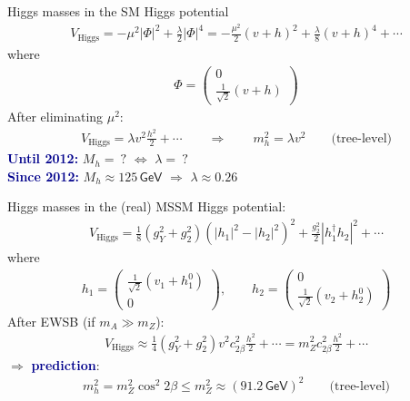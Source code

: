 \documentclass[hyperref={pdfpagelabels=false},ngerman]{beamer}
\newcommand{\eh}[1]{\,\mathsf{#1}}
\renewcommand{\emph}[1]{\textbf{\textcolor{darkblue}{#1}}}
\begin{document}

\begin{frame}[noframenumbering]{Higgs masses in the SM}
  Higgs potential
  \begin{align*}
    V_{\text{Higgs}} = -\mu^2 |\Phi|^2 + \frac{\lambda}{2}|\Phi|^4
    = -\frac{\mu^2}{2} (v+h)^2 + \frac{\lambda}{8} (v+h)^4 + \cdots
  \end{align*}
  where
  \begin{align*}
    \Phi =
    \begin{pmatrix}
      0 \\ \frac{1}{\sqrt{2}} (v + h)
    \end{pmatrix}
  \end{align*}
  After eliminating $\mu^2$:
  \begin{align*}
    V_{\text{Higgs}} = \lambda v^2 \frac{h^2}{2} + \cdots
    \qquad\Rightarrow\qquad
    m_h^2 = \lambda v^2  \qquad \text{(tree-level)}
  \end{align*}
  \emph{Until 2012:} $M_h =\ ?$ $\Leftrightarrow$ $\lambda =\ ?$\\
  \emph{Since 2012:} $M_h \approx 125\eh{GeV}$ $\Rightarrow$ $\lambda \approx 0.26$
\end{frame}


\begin{frame}[noframenumbering]{Higgs masses in the (real) MSSM}
  Higgs potential:
  \begin{align*}
    V_{\text{Higgs}} = \frac{1}{8}(g_Y^2 + g_2^2)(|h_1|^2 - |h_2|^2)^2 + \frac{g_2^2}{2}|h_1^\dagger h_2|^2 + \cdots
  \end{align*}
  where
  \begin{align*}
    h_1 =
    \begin{pmatrix}
      \frac{1}{\sqrt{2}} (v_1 + h_1^0) \\ 0
    \end{pmatrix}, \qquad
    h_2 =
    \begin{pmatrix}
      0 \\ \frac{1}{\sqrt{2}} (v_2 + h_2^0)
    \end{pmatrix}
  \end{align*}
  After EWSB (if $m_A \gg m_Z$):
  \begin{align*}
    V_{\text{Higgs}} \approx \frac{1}{4}(g_Y^2+g_2^2) v^2 c_{2\beta}^2 \frac{h^2}{2} + \cdots
    = m_Z^2 c_{2\beta}^2 \frac{h^2}{2} + \cdots
  \end{align*}
  $\Rightarrow$ \emph{prediction}:
  \begin{align*}
    m_h^2 = m_Z^2 \cos^2{2\beta}
    \leq m_Z^2
    \approx (91.2 \eh{GeV})^2  \qquad \text{(tree-level)}
  \end{align*}
\end{frame}
\end{document}
